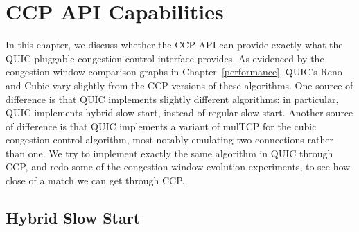 \chapter{CCP API Capabilities}
In this chapter, we discuss whether the CCP API can provide exactly what the QUIC pluggable congestion control interface provides.
As evidenced by the congestion window comparison graphs in Chapter~\ref{performance}, QUIC's Reno and Cubic vary slightly from the CCP versions of these algorithms.
One source of difference is that QUIC implements slightly different algorithms: in particular, QUIC implements hybrid slow start, instead of regular slow start.
Another source of difference is that QUIC implements a variant of mulTCP for the cubic congestion control algorithm, most notably emulating two connections rather than one.
We try to implement exactly the same algorithm in QUIC through CCP, and redo some of the congestion window evolution experiments, to see how close of a match we can get through CCP.
\section{Hybrid Slow Start}
